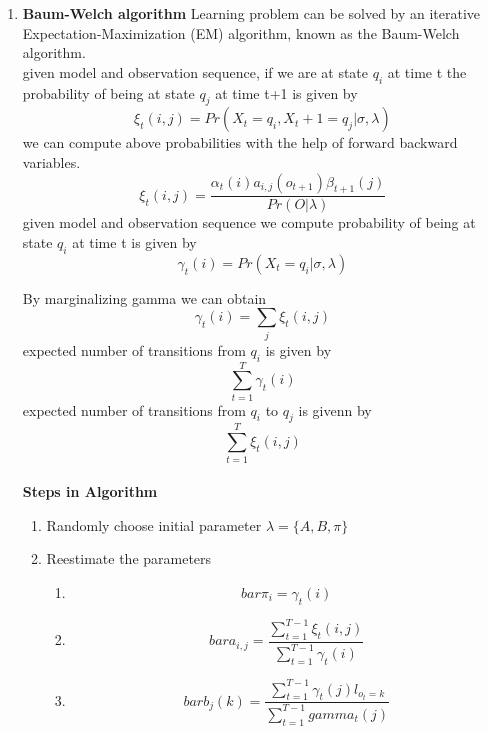 \documentclass[11pt]{report}
\begin{document}
\begin{enumerate}
\item \textbf{Baum-Welch algorithm}
Learning problem can be solved by an iterative Expectation-Maximization (EM) algorithm, known as the Baum-Welch algorithm.
\\
given model and observation sequence, if we are at state $q_i$ at time t the probability of being at state $q_j$ at time t+1 is given by 
\begin{equation}
	\xi_t(i,j) = Pr(X_t = q_i, X_t+1 = q_j | \sigma, \lambda)
\end{equation}
we can compute above probabilities with the help of forward backward variables.
\begin{equation}
\xi_t(i,j) =\frac{\alpha_t(i) a_{i,j} (o_{t+1}) \beta_{t+1}(j)}{Pr(O | \lambda)}
\end{equation}        
given model and observation sequence we compute probability of being at state $q_i$ at time t is given by
\begin{equation}
\gamma_t(i) = Pr(X_t = q_i | \sigma, \lambda)
\end{equation}

By marginalizing gamma we can obtain
\begin{equation}
        \gamma_t(i) = \sum\limits_j \xi_t(i,j)
\end{equation}
expected number of transitions from $q_i$  is given by\begin{equation}
\sum\limits_{t=1}^T \gamma_t(i)
\end{equation} 
expected number of transitions from $q_i$ to $q_j$ is givenn by \begin{equation} \sum\limits_{t=1}^T  \xi_t(i,j)\end{equation}\\


\textbf{ Steps in Algorithm }
\begin{enumerate}
\item Randomly choose initial parameter $\lambda =\{A,B,\pi \}$


\item Reestimate the parameters
\begin{enumerate}

\item \begin{equation}
bar{\pi}_i = \gamma_t(i) 
\end{equation}
\item \begin{equation}                           
bar{a}_{i,j} =\frac{\sum\limits_{t=1}^{T-1}  \xi_t(i,j)}{\sum\limits_{t=1}^{T-1} \gamma_t(i)}                            
\end{equation}
\item \begin{equation}
bar{b}_j(k) = \frac{\sum\limits_{t=1}^{T-1} \gamma_t(j) l_{o_t = k}}{\sum\limits_{t=1}^{T-1} gamma_t(j) }                                  
\end{equation}
\end{enumerate}


\end{enumerate}
\end{enumerate}
\end{document}
